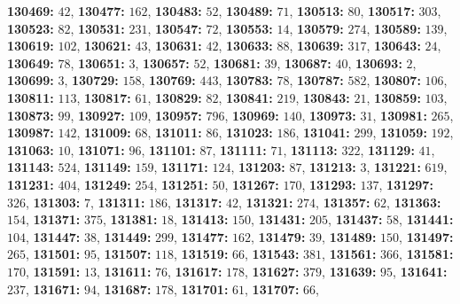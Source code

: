 \textsf{\bfseries 130469:} $42$, \textsf{\bfseries 130477:} $162$, \textsf{\bfseries 130483:} $52$, \textsf{\bfseries 130489:} $71$, \textsf{\bfseries 130513:} $80$, \textsf{\bfseries 130517:} $303$, \textsf{\bfseries 130523:} $82$, \textsf{\bfseries 130531:} $231$, \textsf{\bfseries 130547:} $72$, \textsf{\bfseries 130553:} $14$, \textsf{\bfseries 130579:} $274$, \textsf{\bfseries 130589:} $139$, \textsf{\bfseries 130619:} $102$, \textsf{\bfseries 130621:} $43$, \textsf{\bfseries 130631:} $42$, \textsf{\bfseries 130633:} $88$, \textsf{\bfseries 130639:} $317$, \textsf{\bfseries 130643:} $24$, \textsf{\bfseries 130649:} $78$, \textsf{\bfseries 130651:} $3$, \textsf{\bfseries 130657:} $52$, \textsf{\bfseries 130681:} $39$, \textsf{\bfseries 130687:} $40$, \textsf{\bfseries 130693:} $2$, \textsf{\bfseries 130699:} $3$, \textsf{\bfseries 130729:} $158$, \textsf{\bfseries 130769:} $443$, \textsf{\bfseries 130783:} $78$, \textsf{\bfseries 130787:} $582$, \textsf{\bfseries 130807:} $106$, \textsf{\bfseries 130811:} $113$, \textsf{\bfseries 130817:} $61$, \textsf{\bfseries 130829:} $82$, \textsf{\bfseries 130841:} $219$, \textsf{\bfseries 130843:} $21$, \textsf{\bfseries 130859:} $103$, \textsf{\bfseries 130873:} $99$, \textsf{\bfseries 130927:} $109$, \textsf{\bfseries 130957:} $796$, \textsf{\bfseries 130969:} $140$, \textsf{\bfseries 130973:} $31$, \textsf{\bfseries 130981:} $265$, \textsf{\bfseries 130987:} $142$, \textsf{\bfseries 131009:} $68$, \textsf{\bfseries 131011:} $86$, \textsf{\bfseries 131023:} $186$, \textsf{\bfseries 131041:} $299$, \textsf{\bfseries 131059:} $192$, \textsf{\bfseries 131063:} $10$, \textsf{\bfseries 131071:} $96$, \textsf{\bfseries 131101:} $87$, \textsf{\bfseries 131111:} $71$, \textsf{\bfseries 131113:} $322$, \textsf{\bfseries 131129:} $41$, \textsf{\bfseries 131143:} $524$, \textsf{\bfseries 131149:} $159$, \textsf{\bfseries 131171:} $124$, \textsf{\bfseries 131203:} $87$, \textsf{\bfseries 131213:} $3$, \textsf{\bfseries 131221:} $619$, \textsf{\bfseries 131231:} $404$, \textsf{\bfseries 131249:} $254$, \textsf{\bfseries 131251:} $50$, \textsf{\bfseries 131267:} $170$, \textsf{\bfseries 131293:} $137$, \textsf{\bfseries 131297:} $326$, \textsf{\bfseries 131303:} $7$, \textsf{\bfseries 131311:} $186$, \textsf{\bfseries 131317:} $42$, \textsf{\bfseries 131321:} $274$, \textsf{\bfseries 131357:} $62$, \textsf{\bfseries 131363:} $154$, \textsf{\bfseries 131371:} $375$, \textsf{\bfseries 131381:} $18$, \textsf{\bfseries 131413:} $150$, \textsf{\bfseries 131431:} $205$, \textsf{\bfseries 131437:} $58$, \textsf{\bfseries 131441:} $104$, \textsf{\bfseries 131447:} $38$, \textsf{\bfseries 131449:} $299$, \textsf{\bfseries 131477:} $162$, \textsf{\bfseries 131479:} $39$, \textsf{\bfseries 131489:} $150$, \textsf{\bfseries 131497:} $265$, \textsf{\bfseries 131501:} $95$, \textsf{\bfseries 131507:} $118$, \textsf{\bfseries 131519:} $66$, \textsf{\bfseries 131543:} $381$, \textsf{\bfseries 131561:} $366$, \textsf{\bfseries 131581:} $170$, \textsf{\bfseries 131591:} $13$, \textsf{\bfseries 131611:} $76$, \textsf{\bfseries 131617:} $178$, \textsf{\bfseries 131627:} $379$, \textsf{\bfseries 131639:} $95$, \textsf{\bfseries 131641:} $237$, \textsf{\bfseries 131671:} $94$, \textsf{\bfseries 131687:} $178$, \textsf{\bfseries 131701:} $61$, \textsf{\bfseries 131707:} $66$, 
